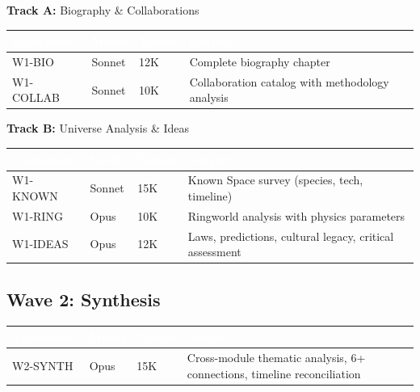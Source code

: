 \documentclass[11pt,letterpaper]{article}
\newcommand{\tableheader}[1]{\textbf{\sffamily\textcolor{white}{#1}}}
\begin{document}
\textbf{Track A:} Biography \& Collaborations

\begin{center}
\begin{tabularx}{\textwidth}{L{2.5cm}C{1.5cm}C{1.5cm}X}
\toprule
{}
\tableheader{Component} & \tableheader{Model} & \tableheader{Tokens} & \tableheader{Output} \\
\midrule
W1-BIO & Sonnet & 12K & Complete biography chapter \\
W1-COLLAB & Sonnet & 10K & Collaboration catalog with methodology analysis \\
\bottomrule
\end{tabularx}
\end{center}

\textbf{Track B:} Universe Analysis \& Ideas

\begin{center}
\begin{tabularx}{\textwidth}{L{2.5cm}C{1.5cm}C{1.5cm}X}
\toprule
{}
\tableheader{Component} & \tableheader{Model} & \tableheader{Tokens} & \tableheader{Output} \\
\midrule
W1-KNOWN & Sonnet & 15K & Known Space survey (species, tech, timeline) \\
W1-RING & Opus & 10K & Ringworld analysis with physics parameters \\
W1-IDEAS & Opus & 12K & Laws, predictions, cultural legacy, critical assessment \\
\bottomrule
\end{tabularx}
\end{center}

\subsection{Wave 2: Synthesis}

\begin{center}
\begin{tabularx}{\textwidth}{L{2.5cm}C{1.5cm}C{1.5cm}X}
\toprule
{}
\tableheader{Component} & \tableheader{Model} & \tableheader{Tokens} & \tableheader{Output} \\
\midrule
W2-SYNTH & Opus & 15K & Cross-module thematic analysis, 6+ connections, timeline reconciliation \\
\bottomrule
\end{tabularx}
\end{center}
\end{document}
